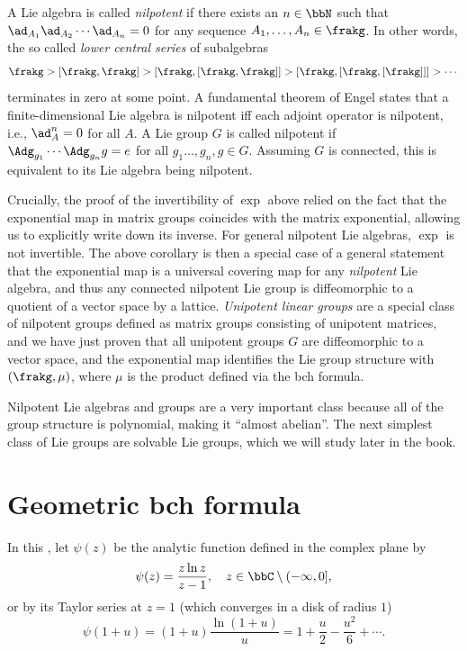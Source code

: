 \begin{rem}\label{rem nilpotent Lie alg}
    A Lie algebra is called \emph{nilpotent} if there exists an $n\in\bbN$ such that $\ad_{A_1}\ad_{A_2}\cdots \ad_{A_n}=0$ for any sequence $A_1,\ldots,A_n\in\frakg$. In other words, the so called \emph{lower central series} of subalgebras 
    \[\frakg>[\frakg,\frakg]>[\frakg,[\frakg,\frakg]]>[\frakg,[\frakg,[\frakg]]]>\cdots\]
    terminates in zero at some point. A fundamental theorem of Engel states that a finite-dimensional Lie algebra is nilpotent iff each adjoint operator is nilpotent, i.e., $\ad_A^n=0$ for all $A$. A Lie group $G$ is called nilpotent if $\Adg_{g_1}\cdots \Adg_{g_n}g=e$ for all $g_1\ldots,g_n,g\in G$. Assuming $G$  is connected, this is equivalent to its Lie algebra being nilpotent. 
    
    Crucially, the proof of the invertibility of $\exp$ above relied on the fact that the exponential map in matrix groups coincides with the matrix exponential, allowing us to explicitly write down its inverse. For general nilpotent Lie algebras, $\exp$ is not invertible. The above corollary is then a special case of a general statement that the exponential map is a universal covering map for any \emph{nilpotent} Lie algebra, and thus any connected nilpotent Lie group is diffeomorphic to a quotient of a vector space by a lattice.  \emph{Unipotent linear groups} are a special class of nilpotent groups defined as matrix groups consisting of unipotent matrices, and we have just proven that all unipotent groups $G$ are diffeomorphic to a vector space, and the exponential map identifies the Lie group structure with $(\frakg,\mu)$, where $\mu$ is the product defined via the \gls{bch} formula.

    Nilpotent Lie algebras and groups are a very important class because all of the group structure is polynomial, making it ``almost abelian''. The next simplest class of Lie groups are solvable Lie groups, which we will study later in the book.
\end{rem}





\section{Geometric \texorpdfstring{\gls{bch}}{BCH} formula}

In this \sect, let $\psi(z)$ be the analytic function defined in the complex plane by
\[\psi(z)=\frac{z\ln z}{z-1},\quad z\in\bbC\setminus(-\infty,0],\]
or by its Taylor series at $z=1$ (which converges in a disk of radius $1$)
\[\psi(1+u)=(1+u)\frac{\ln (1+u)}{u}=1+\frac{u}{2}-\frac{u^2}{6}+\cdots .\]

